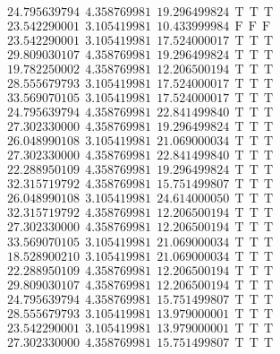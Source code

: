 \documentclass[10pt,a4paper]{article}
\begin{document}
\begin{itemize}
\begin{displaymath}
{\begin{aligned}
&24.795639794 ~~   4.358769981 ~~  19.296499824  ~~\mathrm{T  ~~ T  ~~ T } \\
&23.542290001 ~~   3.105419981 ~~  10.433999984  ~~\mathrm{F  ~~ F  ~~  F} \\
&23.542290001 ~~   3.105419981 ~~  17.524000017  ~~\mathrm{T  ~~ T  ~~ T } \\
&29.809030107 ~~   4.358769981 ~~  19.296499824  ~~\mathrm{T  ~~ T  ~~ T } \\
&19.782250002 ~~   4.358769981 ~~  12.206500194  ~~\mathrm{T  ~~ T  ~~ T } \\
&28.555679793 ~~   3.105419981 ~~  17.524000017  ~~\mathrm{T  ~~ T  ~~ T } \\
&33.569070105 ~~   3.105419981 ~~  17.524000017  ~~\mathrm{T  ~~ T  ~~ T } \\
&24.795639794 ~~   4.358769981 ~~  22.841499840  ~~\mathrm{T  ~~ T  ~~ T } \\
&27.302330000 ~~   4.358769981 ~~  19.296499824  ~~\mathrm{T  ~~ T  ~~ T } \\
&26.048990108 ~~   3.105419981 ~~  21.069000034  ~~\mathrm{T  ~~ T  ~~ T } \\
&27.302330000 ~~   4.358769981 ~~  22.841499840  ~~\mathrm{T  ~~ T  ~~ T } \\
&22.288950109 ~~   4.358769981 ~~  19.296499824  ~~\mathrm{T  ~~ T  ~~ T } \\
&32.315719792 ~~   4.358769981 ~~  15.751499807  ~~\mathrm{T  ~~ T  ~~ T } \\
&26.048990108 ~~   3.105419981 ~~  24.614000050  ~~\mathrm{T  ~~ T  ~~ T } \\
&32.315719792 ~~   4.358769981 ~~  12.206500194  ~~\mathrm{T  ~~ T  ~~ T } \\
&27.302330000 ~~   4.358769981 ~~  12.206500194  ~~\mathrm{T  ~~ T  ~~ T } \\
&33.569070105 ~~   3.105419981 ~~  21.069000034  ~~\mathrm{T  ~~ T  ~~ T } \\
&18.528900210 ~~   3.105419981 ~~  21.069000034  ~~\mathrm{T  ~~ T  ~~ T } \\
&22.288950109 ~~   4.358769981 ~~  12.206500194  ~~\mathrm{T  ~~ T  ~~ T } \\
&29.809030107 ~~   4.358769981 ~~  12.206500194  ~~\mathrm{T  ~~ T  ~~ T } \\
&24.795639794 ~~   4.358769981 ~~  15.751499807  ~~\mathrm{T  ~~ T  ~~ T } \\
&28.555679793 ~~   3.105419981 ~~  13.979000001  ~~\mathrm{T  ~~ T  ~~ T } \\
&23.542290001 ~~   3.105419981 ~~  13.979000001  ~~\mathrm{T  ~~ T  ~~ T } \\
&27.302330000 ~~   4.358769981 ~~  15.751499807  ~~\mathrm{T  ~~ T  ~~ T } 
				\end{aligned}
			}
		\end{displaymath}
\end{itemize}
\end{document}
